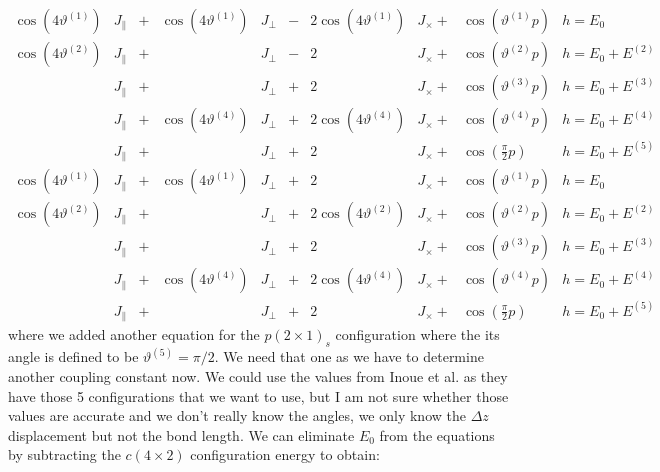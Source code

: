 	\begin{align}
		\cos(4\vartheta^{(1)})&J_\parallel&+& \cos(4\vartheta^{(1)})&J_\perp&-&2\cos(4\vartheta^{(1)})&J_\times+&\cos \left(\vartheta^{(1)}p\right) &h =	E_0 \\
		\cos(4\vartheta^{(2)})&J_\parallel&+&&J_\perp&-&2&J_\times+& \cos \left(\vartheta^{(2)}p\right) &h =	E_0 + E^{(2)} \\
		&J_\parallel&+&&J_\perp&+&2&J_\times+&\cos \left(\vartheta^{(3)}p\right) &h =	E_0 + E^{(3)} \\
		&J_\parallel&+&\cos\left(4\vartheta^{(4)}\right)&J_\perp&+&2\cos(4\vartheta^{(4)})&J_\times+&\cos \left(\vartheta^{(4)}p\right) &h =	E_0 + E^{(4)} \\
		&J_\parallel&+&&J_\perp&+&2&J_\times+&\cos \left(\frac{\pi}{2}p\right) &h =	E_0 + E^{(5)}
	\end{align}
	\begin{align}
		\cos(4\vartheta^{(1)})&J_\parallel&+& \cos(4\vartheta^{(1)})&J_\perp&+&2&J_\times+&\cos \left(\vartheta^{(1)}p\right) &h =	E_0 \\
		\cos(4\vartheta^{(2)})&J_\parallel&+&&J_\perp&+&2\cos(4\vartheta^{(2)})&J_\times+& \cos \left(\vartheta^{(2)}p\right) &h =	E_0 + E^{(2)} \\
		&J_\parallel&+&&J_\perp&+&2&J_\times+&\cos \left(\vartheta^{(3)}p\right) &h =	E_0 + E^{(3)} \\
		&J_\parallel&+&\cos\left(4\vartheta^{(4)}\right)&J_\perp&+&2\cos(4\vartheta^{(4)})&J_\times+&\cos \left(\vartheta^{(4)}p\right) &h =	E_0 + E^{(4)} \\
		&J_\parallel&+&&J_\perp&+&2&J_\times+&\cos \left(\frac{\pi}{2}p\right) &h =	E_0 + E^{(5)}
	\end{align}
	where we added another equation for the $p(2\times1)_s$ configuration where the its angle is defined to be $\vartheta^{(5)} =	\pi /	2$. We need that one as we have to determine another coupling constant now. We could use the values from Inoue et al. as they have those 5 configurations that we want to use, but I am not sure whether those values are accurate and we don't really know the angles, we only know the $\Delta z$ displacement but not the bond length. We can eliminate $E_0$ from the equations by subtracting the $c(4\times2)$ configuration energy to obtain:
